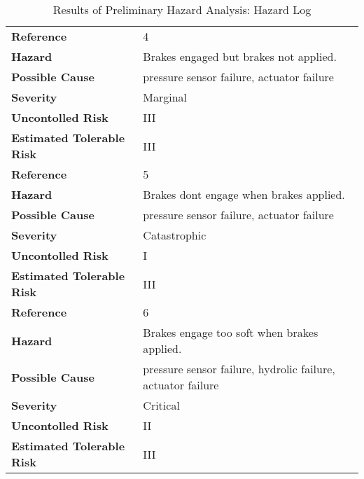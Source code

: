 \documentclass{article}
\begin{document}
\begin{table}[h!tbp]
\begin{center}
\begin{tabular}{|l|l|}
\hline
\textbf{Reference}&	4\\
\textbf{Hazard}&	Brakes engaged but brakes not applied.\\
\textbf{Possible Cause}&	pressure sensor failure, actuator failure\\
\textbf{Severity}&	Marginal\\
\textbf{Uncontolled Risk}&	III\\
\textbf{Estimated Tolerable Risk}&	III\\
\hline
\hline
\textbf{Reference}&	5\\
\textbf{Hazard}&	Brakes dont engage when brakes applied.\\
\textbf{Possible Cause}& pressure sensor failure, actuator failure\\
\textbf{Severity}&	Catastrophic\\
\textbf{Uncontolled Risk}&	I\\
\textbf{Estimated Tolerable Risk}&	III\\
\hline
\hline
\textbf{Reference}&	6\\
\textbf{Hazard}&	Brakes engage too soft when brakes applied.\\
\textbf{Possible Cause}&	pressure sensor failure, hydrolic failure, actuator failure	\\
\textbf{Severity}&	Critical\\
\textbf{Uncontolled Risk}&	II\\
\textbf{Estimated Tolerable Risk}&	III\\
\hline
\end{tabular}
\end{center}
\caption{Results of Preliminary Hazard Analysis: Hazard Log}
\label{fig:HazardLogTable2}
\end{table}
\end{document}
